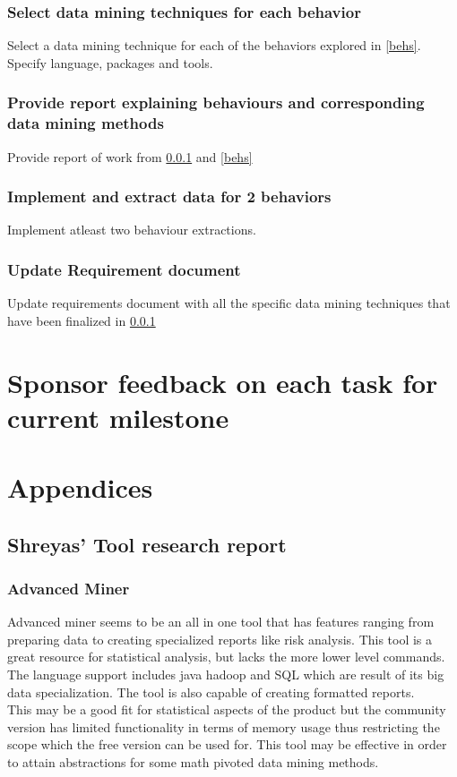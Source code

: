 \documentclass[12pt]{article}
\begin{document}
	\subsubsection{Select data mining techniques for each behavior} \label{techs}
	Select a data mining technique for each of the behaviors explored in \ref{behs}. Specify language, packages and tools.
	\subsubsection{Provide report explaining behaviours and corresponding data mining methods}
	Provide report of work from \ref{techs} and \ref{behs}
	\subsubsection{Implement and extract data for 2 behaviors}
	Implement atleast two behaviour extractions.
	\subsubsection{Update Requirement document}
	Update requirements document with all the specific data mining techniques that have been finalized in \ref{techs}
	\pagebreak
	\section{Sponsor feedback on each task for current milestone}
	\pagebreak
	\section{Appendices}
	\subsection{Shreyas' Tool research report} \label{app_shr}
	\subsubsection{Advanced Miner} \label{adv}
	Advanced miner seems to be an all in one tool that has features ranging from preparing data to creating specialized reports like risk analysis. This tool is a great resource for statistical analysis, but lacks the more lower level commands. \\
	The language support includes java hadoop and SQL which are result of its big data specialization. The tool is also capable of creating formatted reports.\\
	This may be a good fit for statistical aspects of the product but the community version has limited functionality in terms of memory usage thus restricting the scope which the free version can be used for. This tool may be effective in order to attain abstractions for some math pivoted data mining methods.
\end{document}
